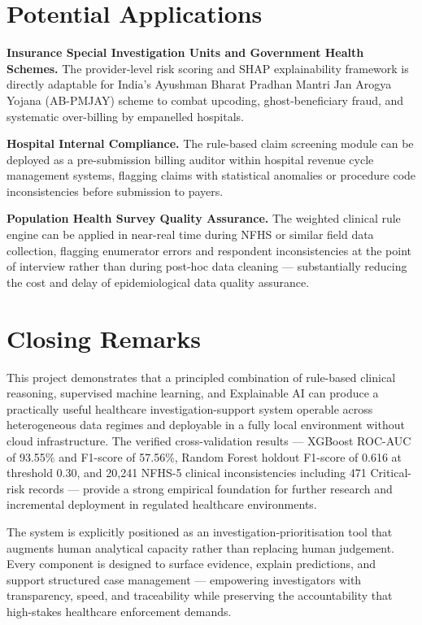 \section{Potential Applications}

\textbf{Insurance Special Investigation Units and Government Health Schemes.} The provider-level risk scoring and SHAP explainability framework is directly adaptable for India's Ayushman Bharat Pradhan Mantri Jan Arogya Yojana (AB-PMJAY) scheme to combat upcoding, ghost-beneficiary fraud, and systematic over-billing by empanelled hospitals.

\textbf{Hospital Internal Compliance.} The rule-based claim screening module can be deployed as a pre-submission billing auditor within hospital revenue cycle management systems, flagging claims with statistical anomalies or procedure code inconsistencies before submission to payers.

\textbf{Population Health Survey Quality Assurance.} The weighted clinical rule engine can be applied in near-real time during NFHS or similar field data collection, flagging enumerator errors and respondent inconsistencies at the point of interview rather than during post-hoc data cleaning --- substantially reducing the cost and delay of epidemiological data quality assurance.

\section*{Closing Remarks}

This project demonstrates that a principled combination of rule-based clinical reasoning, supervised machine learning, and Explainable AI can produce a practically useful healthcare investigation-support system operable across heterogeneous data regimes and deployable in a fully local environment without cloud infrastructure. The verified cross-validation results --- XGBoost ROC-AUC of 93.55\% and F1-score of 57.56\%, Random Forest holdout F1-score of 0.616 at threshold 0.30, and 20,241 NFHS-5 clinical inconsistencies including 471 Critical-risk records --- provide a strong empirical foundation for further research and incremental deployment in regulated healthcare environments.

The system is explicitly positioned as an investigation-prioritisation tool that augments human analytical capacity rather than replacing human judgement. Every component is designed to surface evidence, explain predictions, and support structured case management --- empowering investigators with transparency, speed, and traceability while preserving the accountability that high-stakes healthcare enforcement demands.
